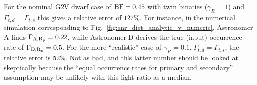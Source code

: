 \documentclass{emulateapj}
\begin{document}
For the nominal G2V dwarf case of ${\rm BF}=0.45$ with twin binaries ($\gamma_R 
= 1$) and $\Gamma_{t,d} = \Gamma_{t,s}$ this gives a relative error of $127\%$.
For instance, in the numerical simulation corresponding to 
Fig.~\ref{fig:snr_dist_analytic_v_numeric}, Astronomer A finds $\Gamma_{\rm 
A,R_p} = 0.22$, while Astronomer 
D derives the true (input) occurrence rate of $\Gamma_{\rm D,R_p} = 0.5$.
For the more ``realistic'' case of $\gamma_R = 0.1$, $\Gamma_{t,d} = 
\Gamma_{t,s}$, the relative error is $52\%$. Not as bad, and this latter number 
should be looked at skeptically because the ``equal occurrence rates for 
primary and secondary'' assumption may be unlikely with this light ratio as a 
median.

\newpage





\end{document}

